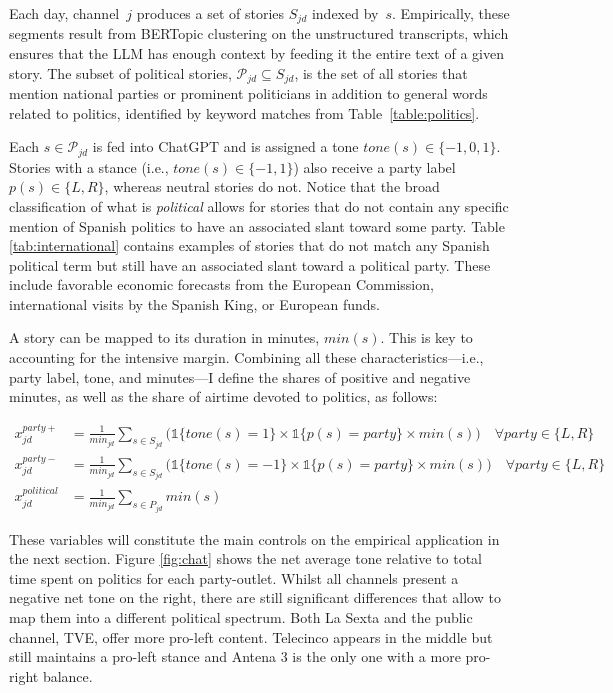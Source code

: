 \documentclass[12pt]{article}
\begin{document}
	Each day, channel~$j$ produces a set of stories $S_{jd}$ indexed by~$s$. Empirically, these segments result from BERTopic clustering on the unstructured transcripts, which ensures that the LLM has enough context by feeding it the entire text of a given story. The subset of political stories, $\mathcal{P}_{jd} \subseteq S_{jd}$, is the set of all stories that mention national parties or prominent politicians in addition to general words related to politics, identified by keyword matches from Table~\ref{table:politics}.
	
	Each $s \in \mathcal{P}_{jd}$ is fed into ChatGPT and is assigned a tone $tone(s) \in \{-1,0,1\}$. Stories with a stance (i.e., $tone(s) \in \{-1,1\}$) also receive a party label $p(s) \in \{L,R\}$, whereas neutral stories do not. Notice that the broad classification of what is \textit{political} allows for stories that do not contain any specific mention of Spanish politics to have an associated slant toward some party. Table \ref{tab:international} contains examples of stories that do not match any Spanish political term but still have an associated slant toward a political party. These include favorable economic forecasts from the European Commission, international visits by the Spanish King, or European funds. 
	
	A story can be mapped to its duration in minutes, $min(s)$. This is key to accounting for the intensive margin. Combining all these characteristics—i.e., party label, tone, and minutes—I define the shares of positive and negative minutes, as well as the share of airtime devoted to politics, as follows:
	
	


		\begin{equation}\label{eq:controls}
		\begin{aligned}
			x_{jd}^{party+}&= \frac{1}{min_{jd}} \sum_{s \in S_{jd}}\bigg(\mathds{1}\{tone(s)=1\} \times \mathds{1}\{p(s)=party\}\times min(s) \bigg) \quad \forall party \in \{L,R\} \\
			x_{jd}^{party-}&= \frac{1}{min_{jd}} \sum_{s \in S_{jd}}\bigg( \mathds{1}\{tone(s)=-1\} \times \mathds{1}\{p(s)=party\} \times min(s)\bigg) \quad \forall party \in \{L,R\} \\
			x_{jd}^{political}&=\frac{1}{min_{jd}} \sum_{s \in P_{jd}}min(s) 
		\end{aligned}
	\end{equation} 
	
	These variables will constitute the main controls on the empirical application in the next section.  Figure \ref{fig:chat} shows the net average tone relative to total time spent on politics  for each party-outlet. Whilst all channels present a negative net tone on the right, there are still significant differences that allow to map them into a different political spectrum. Both La Sexta and the public channel, TVE, offer more pro-left content. Telecinco appears in the middle but still maintains a pro-left stance and Antena 3 is the only one with a more pro-right balance. 	 
	
\end{document}
